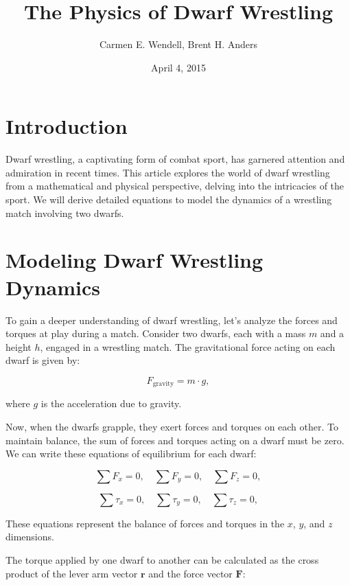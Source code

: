 \documentclass{article}
\title{The Physics of Dwarf Wrestling}
\author{Carmen E. Wendell, Brent H. Anders}
\date{April 4, 2015}
\begin{document}
\maketitle

\section{Introduction}

Dwarf wrestling, a captivating form of combat sport, has garnered attention and admiration in recent times. This article explores the world of dwarf wrestling from a mathematical and physical perspective, delving into the intricacies of the sport. We will derive detailed equations to model the dynamics of a wrestling match involving two dwarfs.

\section{Modeling Dwarf Wrestling Dynamics}

To gain a deeper understanding of dwarf wrestling, let's analyze the forces and torques at play during a match. Consider two dwarfs, each with a mass $m$ and a height $h$, engaged in a wrestling match. The gravitational force acting on each dwarf is given by:

\begin{equation}
F_{\text{gravity}} = m \cdot g,
\end{equation}

where $g$ is the acceleration due to gravity.

Now, when the dwarfs grapple, they exert forces and torques on each other. To maintain balance, the sum of forces and torques acting on a dwarf must be zero. We can write these equations of equilibrium for each dwarf:

\begin{equation}
\sum F_x = 0, \quad \sum F_y = 0, \quad \sum F_z = 0,
\end{equation}

\begin{equation}
\sum \tau_x = 0, \quad \sum \tau_y = 0, \quad \sum \tau_z = 0,
\end{equation}

These equations represent the balance of forces and torques in the $x$, $y$, and $z$ dimensions.

The torque applied by one dwarf to another can be calculated as the cross product of the lever arm vector $\mathbf{r}$ and the force vector $\mathbf{F}$:
\end{document}
